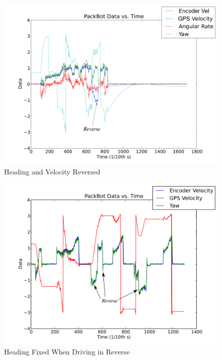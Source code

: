 \begin{figure}[ht!]
	\centering
	\includegraphics[width=.7\textwidth]{images/pbDataReverseHeading}
	\caption{Heading and Velocity Reversed}
	\label{fig:pbDataReverseHeadingBroken}
\end{figure}

\begin{figure}[ht!]
	\centering
	\includegraphics[width=.7\textwidth]{images/KFDataHeadingReverseFixed}
	\caption{Heading Fixed When Driving in Reverse}
	\label{fig:pbDataReverseHeadingFixed}
\end{figure}

